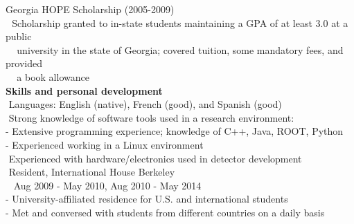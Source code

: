 \indent\hspace{0.2 cm}Georgia HOPE Scholarship (2005-2009)\\ %
\indent\hspace{0.2 cm}\hspace{0.6 cm}\textbullet\,\, Scholarship granted to in-state students maintaining a GPA of at least 3.0 at a public\\
\indent\hspace{0.2 cm}\hspace{0.6 cm}\,\,\,\,\,\,\,university in the state of Georgia; covered tuition, some mandatory fees, and provided\\
\indent\hspace{0.2 cm}\hspace{0.6 cm}\,\,\,\,\,\,\,a book allowance\\

{\noindent\textbf{Skills and personal development}}\\

\indent\hspace{0.2 cm}\textbullet\,\,Languages: English (native), French (good), and Spanish (good)\\

\indent\hspace{0.2 cm}\textbullet\,\,Strong knowledge of software tools used in a research environment:\\
\indent\hspace{0.5 cm}- Extensive programming experience; knowledge of C++, Java, ROOT, Python\\
\indent\hspace{0.5 cm}- Experienced working in a Linux environment\\

\indent\hspace{0.2 cm}\textbullet\,\,Experienced with hardware/electronics used in detector development\\

\indent\hspace{0.2 cm}\textbullet\,\,Resident, International House Berkeley\\
\indent\hspace{0.2 cm}\,\,\,\,\,Aug 2009 - May 2010, Aug 2010 - May 2014\\
\indent\hspace{0.5 cm}- University-affiliated residence for U.S. and international students\\
\indent\hspace{0.5 cm}- Met and conversed with students from different countries on a daily basis\\